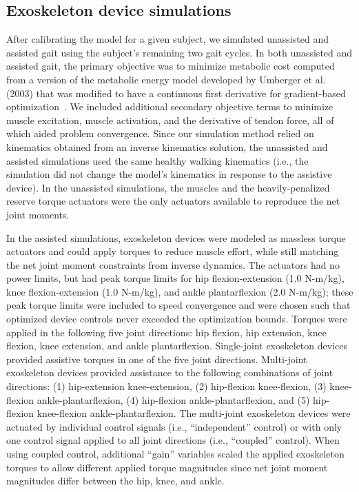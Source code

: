 \documentclass[10pt,letterpaper]{article}
\begin{document}
\subsection*{Exoskeleton device simulations}
After calibrating the model for a given subject, we simulated unassisted and assisted gait using the subject’s remaining two gait cycles. In both unassisted and assisted gait, the primary objective was to minimize metabolic cost computed from a version of the metabolic energy model developed by Umberger et al. (2003) that was modified to have a continuous first derivative for gradient-based optimization~\cite{Umberger:2003, Koelewijn:2018}. We included additional secondary objective terms to minimize muscle excitation, muscle activation, and the derivative of tendon force, all of which aided problem convergence. Since our simulation method relied on kinematics obtained from an inverse kinematics solution, the unassisted and assisted simulations used the same healthy walking kinematics (i.e., the simulation did not change the model's kinematics in response to the assistive device). In the unassisted simulations, the muscles and the heavily-penalized reserve torque actuators were the only actuators available to reproduce the net joint moments.
 
In the assisted simulations, exoskeleton devices were modeled as massless torque actuators and could apply torques to reduce muscle effort, while still matching the net joint moment constraints from inverse dynamics. The actuators had no power limits, but had peak torque limits for hip flexion-extension (1.0 N-m/kg), knee flexion-extension (1.0 N-m/kg), and ankle plantarflexion (2.0 N-m/kg); these peak torque limits were included to speed convergence and were chosen such that optimized device controls never exceeded the optimization bounds. Torques were applied in the following five joint directions: hip flexion, hip extension, knee flexion, knee extension, and ankle plantarflexion. Single-joint exoskeleton devices provided assistive torques in one of the five joint directions. Multi-joint exoskeleton devices provided assistance to the following combinations of joint directions: (1) hip-extension knee-extension, (2) hip-flexion knee-flexion, (3) knee-flexion ankle-plantarflexion, (4) hip-flexion ankle-plantarflexion, and (5) hip-flexion knee-flexion ankle-plantarflexion. The multi-joint exoskeleton devices were actuated by individual control signals (i.e., “independent” control) or with only one control signal applied to all joint directions (i.e., “coupled” control). When using coupled control, additional “gain” variables scaled the applied exoskeleton torques to allow different applied torque magnitudes since net joint moment magnitudes differ between the hip, knee, and ankle.
 
\end{document}
